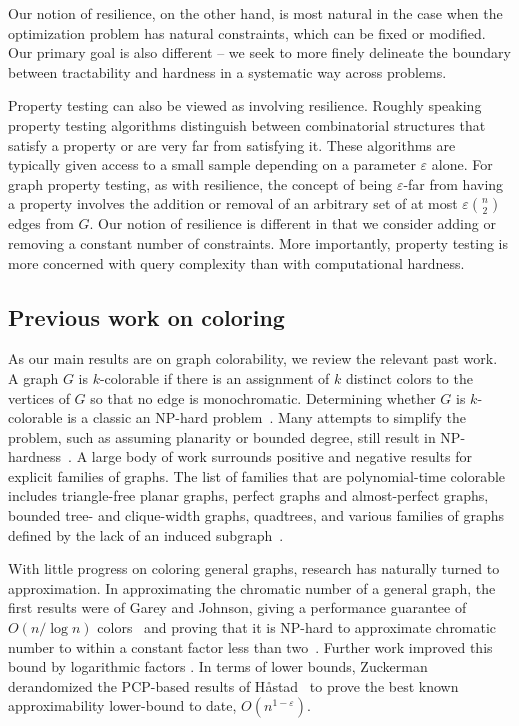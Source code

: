 Our notion of resilience, on the other hand, is most natural in the case when
the optimization problem has natural constraints, which can be fixed or
modified.  Our primary goal is also different -- we seek to more finely
delineate the boundary between tractability and hardness in a systematic way
across problems.

Property testing can also be viewed as involving resilience. Roughly speaking
property testing algorithms distinguish between combinatorial structures that
satisfy a property or are very far from satisfying it. These algorithms are
typically given access to a small sample depending on a parameter $\varepsilon$
alone. For graph property testing, as with resilience, the concept of being
$\varepsilon$-far from having a property involves the addition or removal of an
arbitrary set of at most $\varepsilon \binom{n}{2}$ edges from $G$. Our notion
of resilience is different in that we consider adding or removing a constant
number of constraints. More importantly, property testing is more concerned
with query complexity than with computational hardness.

\subsection{Previous work on coloring}

As our main results are on graph colorability, we review the relevant past
work. A graph $G$ is $k$-colorable if there is an assignment of $k$ distinct
colors to the vertices of $G$ so that no edge is monochromatic. Determining
whether $G$ is $k$-colorable is a classic an NP-hard problem~\cite{Karp72}.
Many attempts to simplify the problem, such as assuming planarity or bounded
degree, still result in NP-hardness~\cite{Dailey80}. A large body of work
surrounds positive and negative results for explicit families of graphs. The
list of families that are polynomial-time colorable includes triangle-free
planar graphs, perfect graphs and almost-perfect graphs, bounded tree- and
clique-width graphs, quadtrees, and various families of graphs defined by the
lack of an induced subgraph~\cite{Cai03,EBH99,HMM10,Ko03,KKTW01}.

With little progress on coloring general graphs, research has naturally turned
to approximation. In approximating the chromatic number of a general graph, the
first results were of Garey and Johnson, giving a performance guarantee of
$O(n/\log n)$ colors~\cite{Johnson74} and proving that it is NP-hard to
approximate chromatic number to within a constant factor less than
two~\cite{GJ76}. Further work improved this bound by logarithmic factors
\cite{BR90,Ha93}. In terms of lower bounds, Zuckerman~\cite{Zu07} derandomized
the PCP-based results of H{\aa}stad~\cite{Ha99} to prove the best known
approximability lower-bound to date, $O(n^{1-\varepsilon})$.

